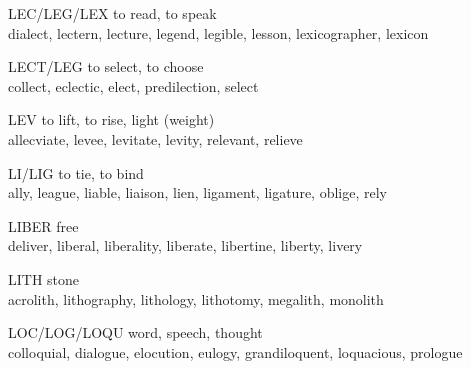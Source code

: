 \begin{flashcard}[Roots]{LEC/LEG/LEX}
to read, to speak\\
\vspace{0.2in}
dialect, lectern, lecture, legend, legible, lesson, lexicographer, lexicon\\
\end{flashcard}

\begin{flashcard}[Roots]{LECT/LEG}
to select, to choose\\
\vspace{0.2in}
collect, eclectic, elect, predilection, select\\
\end{flashcard}

\begin{flashcard}[Roots]{LEV}
to lift, to rise, light (weight)\\
\vspace{0.2in}
allecviate, levee, levitate, levity, relevant, relieve\\
\end{flashcard}

\begin{flashcard}[Roots]{LI/LIG}
to tie, to bind\\
\vspace{0.2in}
ally, league, liable, liaison, lien, ligament, ligature, oblige, rely\\
\end{flashcard}

\begin{flashcard}[Roots]{LIBER}
free\\
\vspace{0.2in}
deliver, liberal, liberality, liberate, libertine, liberty, livery\\
\end{flashcard}

\begin{flashcard}[Roots]{LITH}
stone\\
\vspace{0.2in}
acrolith, lithography, lithology, lithotomy, megalith, monolith\\
\end{flashcard}

\begin{flashcard}[Roots]{LOC/LOG/LOQU}
word, speech, thought\\
\vspace{0.2in}
colloquial, dialogue, elocution, eulogy, grandiloquent, loquacious, prologue\\
\end{flashcard}

